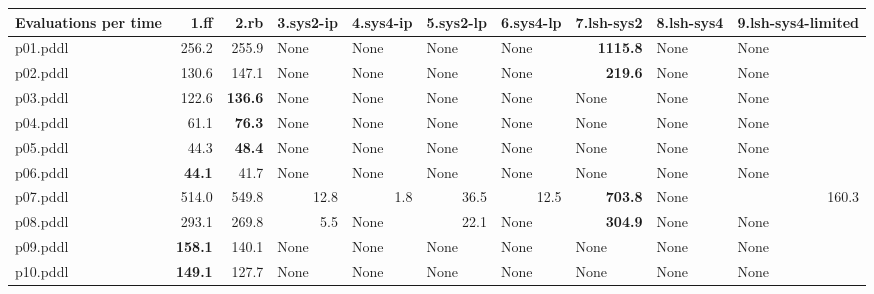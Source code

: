 \documentclass{article}
\begin{document}
\begin{tabular}{@{}lrrrrrrrrr@{}}
Evaluations per time & 1.ff & 2.rb & 3.sys2-ip & 4.sys4-ip & 5.sys2-lp & 6.sys4-lp & 7.lsh-sys2 & 8.lsh-sys4 & 9.lsh-sys4-limited \\
\midrule
p01.pddl & 256.2 & 255.9 & \multicolumn{1}{|l|}{None} & \multicolumn{1}{|l|}{None} & \multicolumn{1}{|l|}{None} & \multicolumn{1}{|l|}{None} & \textbf{1115.8} & \multicolumn{1}{|l|}{None} & \multicolumn{1}{|l|}{None} \\
p02.pddl & 130.6 & 147.1 & \multicolumn{1}{|l|}{None} & \multicolumn{1}{|l|}{None} & \multicolumn{1}{|l|}{None} & \multicolumn{1}{|l|}{None} & \textbf{219.6} & \multicolumn{1}{|l|}{None} & \multicolumn{1}{|l|}{None} \\
p03.pddl & 122.6 & \textbf{136.6} & \multicolumn{1}{|l|}{None} & \multicolumn{1}{|l|}{None} & \multicolumn{1}{|l|}{None} & \multicolumn{1}{|l|}{None} & \multicolumn{1}{|l|}{None} & \multicolumn{1}{|l|}{None} & \multicolumn{1}{|l|}{None} \\
p04.pddl & 61.1 & \textbf{76.3} & \multicolumn{1}{|l|}{None} & \multicolumn{1}{|l|}{None} & \multicolumn{1}{|l|}{None} & \multicolumn{1}{|l|}{None} & \multicolumn{1}{|l|}{None} & \multicolumn{1}{|l|}{None} & \multicolumn{1}{|l|}{None} \\
p05.pddl & 44.3 & \textbf{48.4} & \multicolumn{1}{|l|}{None} & \multicolumn{1}{|l|}{None} & \multicolumn{1}{|l|}{None} & \multicolumn{1}{|l|}{None} & \multicolumn{1}{|l|}{None} & \multicolumn{1}{|l|}{None} & \multicolumn{1}{|l|}{None} \\
p06.pddl & \textbf{44.1} & 41.7 & \multicolumn{1}{|l|}{None} & \multicolumn{1}{|l|}{None} & \multicolumn{1}{|l|}{None} & \multicolumn{1}{|l|}{None} & \multicolumn{1}{|l|}{None} & \multicolumn{1}{|l|}{None} & \multicolumn{1}{|l|}{None} \\
p07.pddl & 514.0 & 549.8 & 12.8 & 1.8 & 36.5 & 12.5 & \textbf{703.8} & \multicolumn{1}{|l|}{None} & 160.3 \\
p08.pddl & 293.1 & 269.8 & 5.5 & \multicolumn{1}{|l|}{None} & 22.1 & \multicolumn{1}{|l|}{None} & \textbf{304.9} & \multicolumn{1}{|l|}{None} & \multicolumn{1}{|l|}{None} \\
p09.pddl & \textbf{158.1} & 140.1 & \multicolumn{1}{|l|}{None} & \multicolumn{1}{|l|}{None} & \multicolumn{1}{|l|}{None} & \multicolumn{1}{|l|}{None} & \multicolumn{1}{|l|}{None} & \multicolumn{1}{|l|}{None} & \multicolumn{1}{|l|}{None} \\
p10.pddl & \textbf{149.1} & 127.7 & \multicolumn{1}{|l|}{None} & \multicolumn{1}{|l|}{None} & \multicolumn{1}{|l|}{None} & \multicolumn{1}{|l|}{None} & \multicolumn{1}{|l|}{None} & \multicolumn{1}{|l|}{None} & \multicolumn{1}{|l|}{None} \\

\end{tabular}
\end{document}
